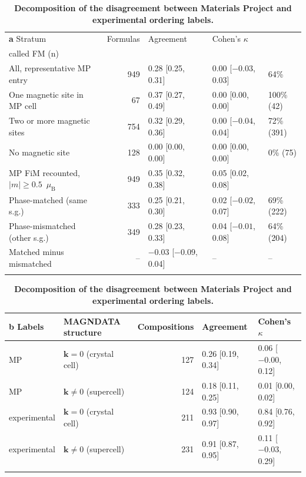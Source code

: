 \documentclass[pdflatex,sn-nature]{sn-jnl}
\makeatletter
\newcommand{\muB}{\ensuremath{\mu_\mathrm{B}}}
\newcommand{\ci}[2]{[#1, #2]}
\newcommand{\hd}[1]{\begin{tabular}[b]{@{}c@{}}#1\end{tabular}}
\makeatother
\begin{document}
\begin{table}[!ht]
\caption{\textbf{Decomposition of the disagreement between Materials Project and experimental ordering labels.}}\label{tab:s25}%
\setlength{\tabcolsep}{3pt}%
\begin{tabular*}{\textwidth}{@{\extracolsep\fill}lrlll@{}}
\toprule
\textbf{a} Stratum & Formulas & Agreement & Cohen's $\kappa$ & \hd{Exp.\ AFM\\called FM (n)} \\
\midrule
All, representative MP entry & 949 & 0.28 \ci{0.25}{0.31} & 0.00 \ci{$-0.03$}{0.03} & 64\% \\
One magnetic site in MP cell & 67 & 0.37 \ci{0.27}{0.49} & 0.00 \ci{0.00}{0.00} & 100\% (42) \\
Two or more magnetic sites & 754 & 0.32 \ci{0.29}{0.36} & 0.00 \ci{$-0.04$}{0.04} & 72\% (391) \\
No magnetic site & 128 & 0.00 \ci{0.00}{0.00} & 0.00 \ci{0.00}{0.00} & 0\% (75) \\
MP FiM recounted, $|m|\ge0.5$~\muB{} & 949 & 0.35 \ci{0.32}{0.38} & 0.05 \ci{0.02}{0.08} &  \\
Phase-matched (same s.g.) & 333 & 0.25 \ci{0.21}{0.30} & 0.02 \ci{$-0.02$}{0.07} & 69\% (222) \\
Phase-mismatched (other s.g.) & 349 & 0.28 \ci{0.23}{0.33} & 0.04 \ci{$-0.01$}{0.08} & 64\% (204) \\
Matched minus mismatched & -- & $-0.03$ \ci{$-0.09$}{0.04} & -- & -- \\
\botrule
\end{tabular*}

\vspace{6pt}
\begin{tabular*}{\textwidth}{@{\extracolsep\fill}llrll@{}}
\toprule
\textbf{b} Labels & MAGNDATA structure & Compositions & Agreement & Cohen's $\kappa$ \\
\midrule
MP & $\mathbf{k}=0$ (crystal cell) & 127 & 0.26 \ci{0.19}{0.34} & 0.06 \ci{$-0.00$}{0.12} \\
MP & $\mathbf{k}\neq0$ (supercell) & 124 & 0.18 \ci{0.11}{0.25} & 0.01 \ci{0.00}{0.02} \\
experimental & $\mathbf{k}=0$ (crystal cell) & 211 & 0.93 \ci{0.90}{0.97} & 0.84 \ci{0.76}{0.92} \\
experimental & $\mathbf{k}\neq0$ (supercell) & 231 & 0.91 \ci{0.87}{0.95} & 0.11 \ci{$-0.03$}{0.29} \\
\botrule
\end{tabular*}


\end{table}
\end{document}
